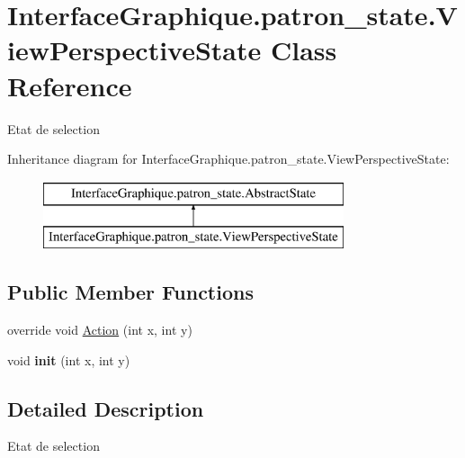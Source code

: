 \hypertarget{class_interface_graphique_1_1patron__state_1_1_view_perspective_state}{\section{Interface\-Graphique.\-patron\-\_\-state.\-View\-Perspective\-State Class Reference}
\label{class_interface_graphique_1_1patron__state_1_1_view_perspective_state}
}


Etat de selection  


Inheritance diagram for Interface\-Graphique.\-patron\-\_\-state.\-View\-Perspective\-State\-:\begin{figure}[H]
\begin{center}
\leavevmode
\includegraphics[height=2.000000cm]{class_interface_graphique_1_1patron__state_1_1_view_perspective_state}
\end{center}
\end{figure}
\subsection*{Public Member Functions}
\begin{DoxyCompactItemize}
\item 
override void \hyperlink{class_interface_graphique_1_1patron__state_1_1_view_perspective_state_a111b6675fe8e49465a5ba6eb49b4081f}{Action} (int x, int y)
\item 
\hypertarget{class_interface_graphique_1_1patron__state_1_1_view_perspective_state_a317eccb2539a14a9e75fdf0d625db455}{void {\bfseries init} (int x, int y)}\label{class_interface_graphique_1_1patron__state_1_1_view_perspective_state_a317eccb2539a14a9e75fdf0d625db455}

\end{DoxyCompactItemize}


\subsection{Detailed Description}
Etat de selection 



